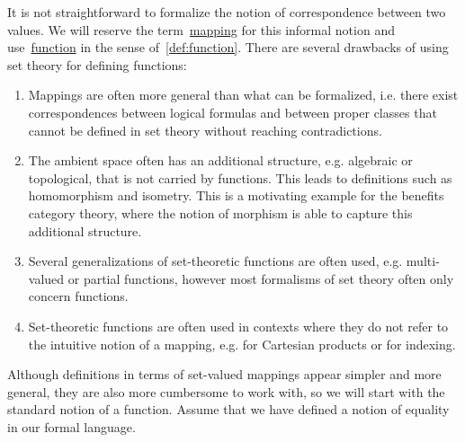 It is not straightforward to formalize the notion of correspondence between two values. We will reserve the term~\uline{mapping} for this informal notion and use~\uline{function} in the sense of~\cref{def:function}. There are several drawbacks of using set theory for defining functions:
\begin{enumerate}
  \item Mappings are often more general than what can be formalized, i.e. there exist correspondences between logical formulas and between proper classes that cannot be defined in set theory without reaching contradictions.
  \item The ambient space often has an additional structure, e.g. algebraic or topological, that is not carried by functions. This leads to definitions such as homomorphism and isometry. This is a motivating example for the benefits category theory, where the notion of morphism is able to capture this additional structure.
  \item Several generalizations of set-theoretic functions are often used, e.g. multi-valued or partial functions, however most formalisms of set theory often only concern functions.
  \item Set-theoretic functions are often used in contexts where they do not refer to the intuitive notion of a mapping, e.g. for Cartesian products or for indexing.
\end{enumerate}

Although definitions in terms of set-valued mappings appear simpler and more general, they are also more cumbersome to work with, so we will start with the standard notion of a function. Assume that we have defined a notion of equality in our formal language.

